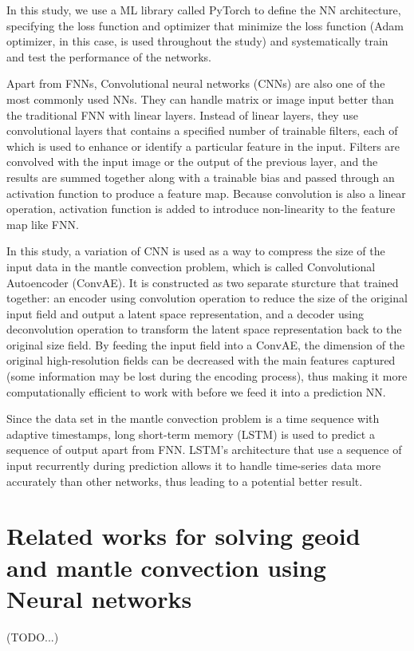 In this study, we use a ML library called PyTorch to define the NN architecture, specifying the loss function and optimizer that minimize the loss function (Adam optimizer, in this case, is used throughout the study) and systematically train and test the performance of the networks.

Apart from FNNs, Convolutional neural networks (CNNs) are also one of the most commonly used NNs. They can handle matrix or image input better than the traditional FNN with linear layers. Instead of linear layers, they use convolutional layers that contains a specified number of trainable filters, each of which is used to enhance or identify a particular feature in the input. Filters are convolved with the input image or the output of the previous layer, and the results are summed together along with a trainable bias and passed through an activation function to produce a feature map. Because convolution is also a linear operation, activation function is added to introduce non-linearity to the feature map like FNN.

In this study, a variation of CNN is used as a way to compress the size of the input data in the mantle convection problem, which is called Convolutional Autoencoder (ConvAE). It is constructed as two separate sturcture that trained together: an encoder using convolution operation to reduce the size of the original input field and output a latent space representation, and a decoder using deconvolution operation to transform the latent space representation back to the original size field. By feeding the input field into a ConvAE, the dimension of the original high-resolution fields can be decreased with the main features captured (some information may be lost during the encoding process), thus making it more computationally efficient to work with before we feed it into a prediction NN.

Since the data set in the mantle convection problem is a time sequence with adaptive timestamps, long short-term memory (LSTM) is used to predict a sequence of output apart from FNN. LSTM's architecture that use a sequence of input recurrently during prediction allows it to handle time-series data more accurately than other networks, thus leading to a potential better result.


\section{Related works for solving geoid and mantle convection using Neural networks}

(TODO...)